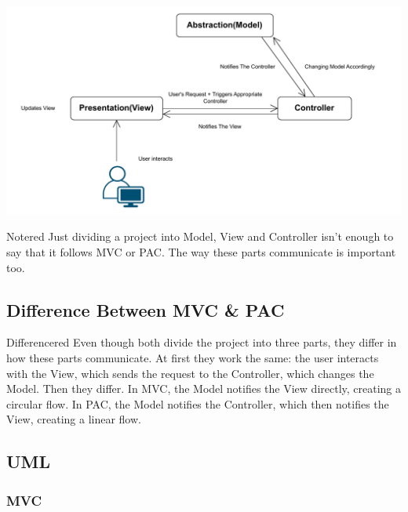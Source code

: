 \vspace{0.1cm}
\begin{center}
\includegraphics[height=0.25\textheight]{Chapters/MVC_PAC/pac1.drawio.pdf}
\end{center}

\vspace{0.25cm}

\begin{prettyBox}{Note}{red}
Just dividing a project into Model, View and Controller isn't enough to say that it follows MVC or PAC. The way these parts communicate is important too.
\end{prettyBox}

\vspace{0.5cm}

\subsection{Difference Between MVC \& PAC}
\begin{prettyBox}{Difference}{red}
Even though both divide the project into three parts, they differ in how these parts communicate. At first they work
the same: the user interacts with the View, which sends the request to the Controller, which changes the Model. Then they
differ. In MVC, the Model notifies the View directly, creating a circular flow. In PAC, the Model notifies the
Controller, which then notifies the View, creating a linear flow.
\end{prettyBox}

\newpage
\subsection{UML}
\subsubsection{MVC}

